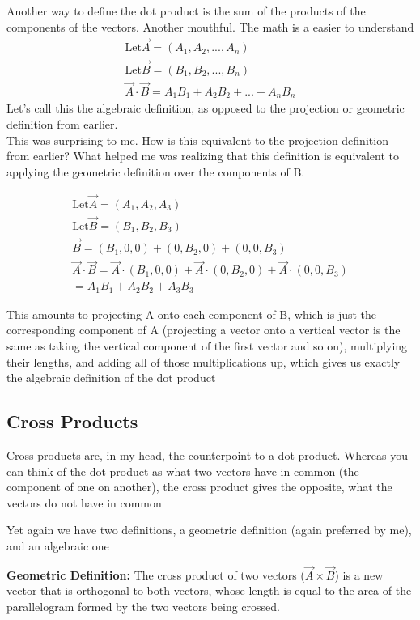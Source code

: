 \documentclass[12pt, letterpaper]{article}
\begin{document}
\label{equOfDotProductDefinitions}
Another way to define the dot product is the sum of the products of the components of the vectors. Another mouthful. The math is a easier to understand
\begin{gather*}
    \text{Let} \vec{A} = (A_1, A_2, ..., A_n)\\
    \text{Let} \vec{B} = (B_1, B_2, ..., B_n)\\
    \vec{A} \cdot \vec{B} = A_1 B_1 + A_2 B_2 + ... + A_n B_n
\end{gather*}
Let's call this the algebraic definition, as opposed to the projection or geometric definition from earlier.\\
This was surprising to me. How is this equivalent to the projection definition from earlier?
What helped me was realizing that this definition is equivalent to applying the geometric definition over the components of B.

\begin{gather*}
    \text{Let} \vec{A} = (A_1, A_2, A_3)\\
    \text{Let} \vec{B} = (B_1, B_2, B_3)\\
    \vec{B} = (B_1, 0, 0) + (0, B_2, 0) + (0, 0, B_3)\\
    \vec{A} \cdot \vec{B} =  \vec{A} \cdot (B_1, 0, 0) + \vec{A} \cdot (0, B_2, 0) + \vec{A} \cdot (0, 0, B_3)\\
    = A_1 B_1 + A_2 B_2 + A_3 B_3
\end{gather*}

This amounts to projecting A onto each component of B, which is just the corresponding component of A (projecting a vector onto a vertical vector is the same as taking the vertical component of the first vector and so on), 
multiplying their lengths, and adding all of those multiplications up, which gives us exactly the algebraic definition of the dot product


\subsection{Cross Products}
Cross products are, in my head, the counterpoint to a dot product. Whereas you can think of the dot product as what two vectors have in common (the component of one on another), the cross product gives the opposite, what the vectors do not have in common

Yet again we have two definitions, a geometric definition (again preferred by me), and an algebraic one

\textbf{Geometric Definition:} The cross product of two vectors ($\vec{A} \times \vec{B}$) is a new vector that is orthogonal to both vectors, whose length is equal to the area of the parallelogram formed by the two vectors being crossed.
\end{document}
